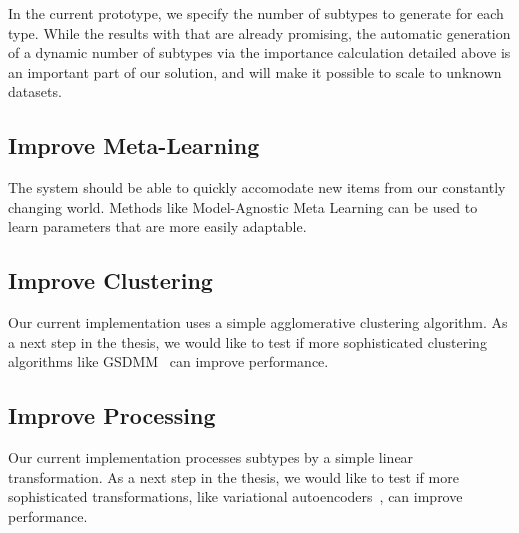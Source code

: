 In the current prototype, we specify the number of subtypes to generate for each type.
While the results with that are already promising, the automatic generation of a dynamic number of subtypes via the importance calculation detailed above is an important part of our solution, and will make it possible to scale to unknown datasets.

\subsection{Improve Meta-Learning}

The system should be able to quickly accomodate new items from our constantly changing world.
Methods like Model-Agnostic Meta Learning \cite{finn_model-agnostic_2017} can be used to learn parameters that are more easily adaptable.

\subsection{Improve Clustering}

Our current implementation uses a simple agglomerative clustering algorithm.
As a next step in the thesis, we would like to test if more sophisticated clustering algorithms like GSDMM~\cite{yin_gsdmm_2014}
can improve performance.


\subsection{Improve Processing} 

Our current implementation processes subtypes by a simple linear transformation.
As a next step in the thesis, we would like to test if more sophisticated transformations, like variational autoencoders~\cite{kingma_auto-encoding_2022}, can improve performance.



